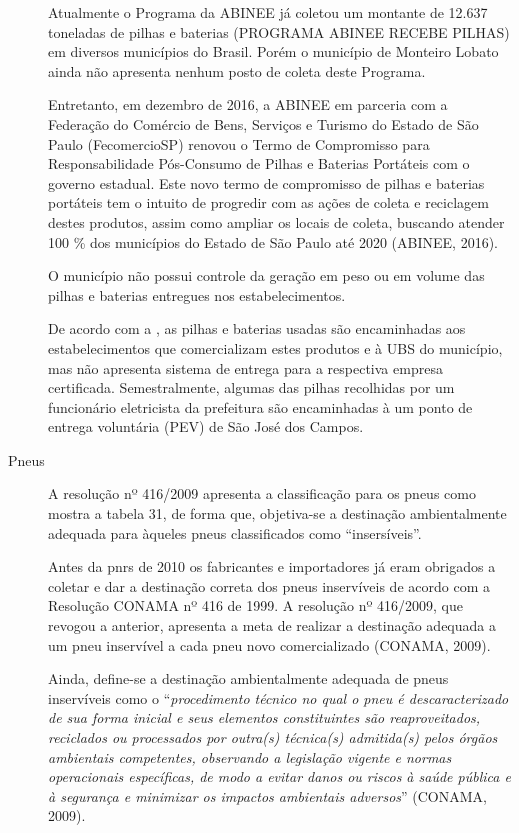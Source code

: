 \begin{description}
		Atualmente o Programa da ABINEE já coletou um montante de 12.637 toneladas de pilhas e baterias (PROGRAMA ABINEE RECEBE PILHAS) em diversos municípios do Brasil. Porém o município de Monteiro Lobato ainda não apresenta nenhum posto de coleta deste Programa.
		
		Entretanto, em dezembro de 2016, a ABINEE em parceria com a Federação do Comércio de Bens, Serviços e Turismo do Estado de São Paulo (FecomercioSP) renovou o Termo de Compromisso para Responsabilidade Pós-Consumo de Pilhas e Baterias Portáteis com o governo estadual. Este novo termo de compromisso de pilhas e baterias portáteis tem o intuito de progredir com as ações de coleta e reciclagem destes produtos, assim como ampliar os locais de coleta, buscando atender 100 \% dos municípios do Estado de São Paulo até 2020 (ABINEE, 2016).
		
			O município não possui controle da geração em peso ou em volume das pilhas e baterias entregues nos estabelecimentos.
		
			De acordo com a , as pilhas e baterias usadas são encaminhadas aos estabelecimentos que comercializam estes produtos e à UBS do município, mas não apresenta sistema de entrega para a respectiva empresa certificada. Semestralmente, algumas das pilhas recolhidas por um funcionário eletricista da prefeitura são encaminhadas à um ponto de entrega voluntária (PEV) de São José dos Campos.
		
		
		\item[Pneus] A resolução nº 416/2009 apresenta a classificação para os pneus como mostra a tabela 31, de forma que, objetiva-se a destinação ambientalmente adequada para àqueles pneus classificados como “insersíveis”.	
	
		
	
		Antes da \gls{pnrs} de 2010 os fabricantes e importadores já eram obrigados a coletar e dar a destinação correta dos pneus inservíveis de acordo com a Resolução CONAMA nº 416 de 1999. A resolução nº 416/2009, que revogou a anterior, apresenta a meta de realizar a destinação adequada a um pneu inservível a cada pneu novo comercializado (CONAMA, 2009).

		Ainda, define-se a destinação ambientalmente adequada de pneus inservíveis como o “\textit{procedimento técnico no qual o pneu é descaracterizado de sua forma inicial e seus elementos constituintes são reaproveitados, reciclados ou processados por outra(s) técnica(s) admitida(s) pelos órgãos ambientais competentes, observando a legislação vigente e normas operacionais específicas, de modo a evitar danos ou riscos à saúde pública e à segurança e minimizar os impactos ambientais adversos}” (CONAMA, 2009). 
	

\end{description}
